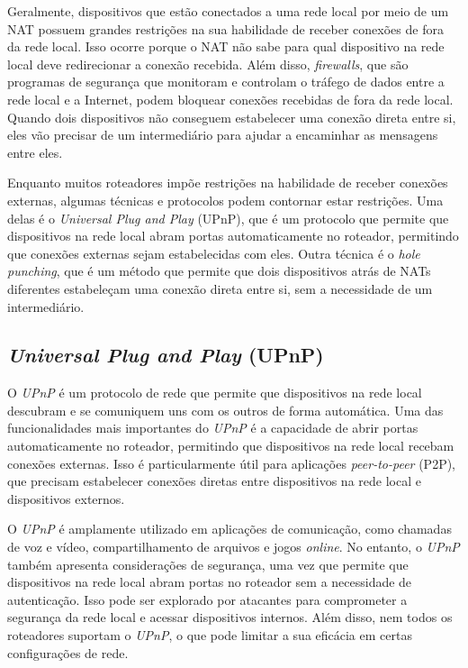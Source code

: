 Geralmente, dispositivos que estão conectados a uma rede local por meio de um NAT possuem grandes restrições na sua habilidade de receber conexões de fora da rede local. Isso ocorre porque o NAT não sabe para qual dispositivo na rede local deve redirecionar a conexão recebida. Além disso, \textit{firewalls}, que são programas de segurança que monitoram e controlam o tráfego de dados entre a rede local e a Internet, podem bloquear conexões recebidas de fora da rede local. Quando dois dispositivos não conseguem estabelecer uma conexão direta entre si, eles vão precisar de um intermediário para ajudar a encaminhar as mensagens entre eles.

Enquanto muitos roteadores impõe restrições na habilidade de receber conexões externas, algumas técnicas e protocolos podem contornar estar restrições. Uma delas é o \textit{Universal Plug and Play} (UPnP), que é um protocolo que permite que dispositivos na rede local abram portas automaticamente no roteador, permitindo que conexões externas sejam estabelecidas com eles. Outra técnica é o \textit{hole punching}, que é um método que permite que dois dispositivos atrás de NATs diferentes estabeleçam uma conexão direta entre si, sem a necessidade de um intermediário.

\subsection{\textit{Universal Plug and Play} (UPnP)}

O \textit{UPnP} é um protocolo de rede que permite que dispositivos na rede local descubram e se comuniquem uns com os outros de forma automática. Uma das funcionalidades mais importantes do \textit{UPnP} é a capacidade de abrir portas automaticamente no roteador, permitindo que dispositivos na rede local recebam conexões externas. Isso é particularmente útil para aplicações \textit{peer-to-peer} (P2P), que precisam estabelecer conexões diretas entre dispositivos na rede local e dispositivos externos.

O \textit{UPnP} é amplamente utilizado em aplicações de comunicação, como chamadas de voz e vídeo, compartilhamento de arquivos e jogos \textit{online}. No entanto, o \textit{UPnP} também apresenta considerações de segurança, uma vez que permite que dispositivos na rede local abram portas no roteador sem a necessidade de autenticação. Isso pode ser explorado por atacantes para comprometer a segurança da rede local e acessar dispositivos internos. Além disso, nem todos os roteadores suportam o \textit{UPnP}, o que pode limitar a sua eficácia em certas configurações de rede.

